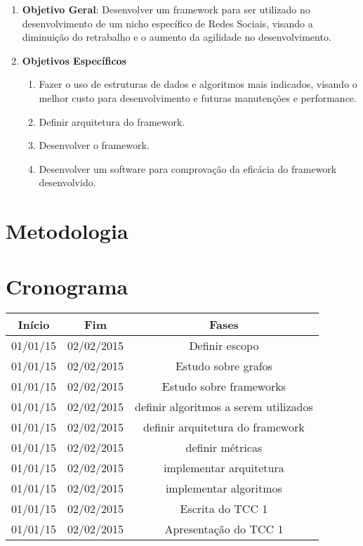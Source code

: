 \begin{enumerate}
	\item \textbf{Objetivo Geral}: Desenvolver um framework para ser utilizado no desenvolvimento de um nicho específico de Redes Sociais, visando a diminuição do retrabalho e o aumento da agilidade no desenvolvimento.

	\item \textbf{Objetivos Específicos}
	\begin{enumerate}
		\item Fazer o uso de estruturas de dados e algoritmos mais indicados, visando o melhor custo para desenvolvimento e futuras manutenções e performance.
		\item Definir arquitetura do framework.
		\item Desenvolver o framework.
		\item Desenvolver um software para comprovação da eficácia do framework desenvolvido.
	\end{enumerate}
\end{enumerate}

\section*{Metodologia}

\section*{Cronograma}

\begin{tabular}{SSS} \toprule
    {Início} & {Fim} & {Fases} \\ \toprule
    {01/01/15} & {02/02/2015} & {Definir escopo} \\
    {01/01/15} & {02/02/2015} & {Estudo sobre grafos} \\
    {01/01/15} & {02/02/2015} & {Estudo sobre frameworks} \\ \midrule
    {01/01/15} & {02/02/2015} & {definir algoritmos a serem utilizados} \\
    {01/01/15} & {02/02/2015} & {definir arquitetura do framework} \\
    {01/01/15} & {02/02/2015} & {definir métricas} \\ \midrule
    {01/01/15} & {02/02/2015} & {implementar arquitetura} \\
    {01/01/15} & {02/02/2015} & {implementar algoritmos} \\ \midrule
    {01/01/15} & {02/02/2015} & {Escrita do TCC 1} \\
    {01/01/15} & {02/02/2015} & {Apresentação do TCC 1} \\ \bottomrule
\end{tabular}

\postextual

 


